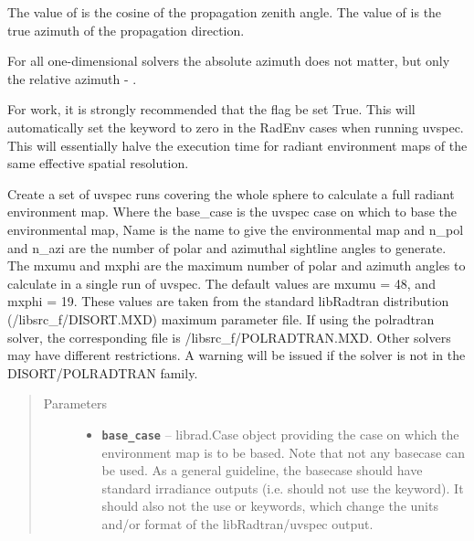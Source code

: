 \documentclass[a4paper,10pt,english]{sphinxmanual}
\begin{document}
\begin{fulllineitems}
The value of  is the cosine of the propagation zenith angle. The value of  is the true azimuth of
the propagation direction.

For all one-dimensional solvers the absolute azimuth does not matter, but only the relative azimuth
 - .

For  work, it is strongly recommended that the  flag be set True. This will automatically
set the  keyword to zero in the RadEnv cases when running uvspec. This will essentially halve the
execution time for radiant environment maps of the same effective spatial resolution.

\begin{fulllineitems}
\label{packages:librad.RadEnv.__init__}
Create a set of uvspec runs covering the whole sphere to calculate a full radiant environment map.
Where the base\_case is the uvspec case on which to base the environmental map, Name is the name to give the
environmental map and n\_pol and n\_azi are the number of polar and azimuthal sightline angles to generate. The
mxumu and mxphi are the maximum number of polar and azimuth angles to calculate in a single run of uvspec.
The default values are mxumu = 48, and mxphi = 19. These values are taken from the standard libRadtran
distribution (/libsrc\_f/DISORT.MXD) maximum parameter file. If using the polradtran solver, the corresponding
file is /libsrc\_f/POLRADTRAN.MXD. Other solvers may have different restrictions. A warning will be issued if
the solver is not in the DISORT/POLRADTRAN family.
\begin{quote}\begin{description}
\item[{Parameters}] \leavevmode\begin{itemize}
\item {} 
\textbf{\texttt{base\_case}} -- 
librad.Case object providing the case on which the environment map is to be based. Note
that not any basecase can be used. As a general guideline, the basecase should have standard irradiance
outputs (i.e. should not use the  keyword). It should also not the use  or
 keywords, which change the units and/or format of the libRadtran/uvspec output.
\begin{quote}


\end{quote}
\end{itemize}
\end{description}
\end{quote}
\end{fulllineitems}
\end{fulllineitems}
\end{document}
